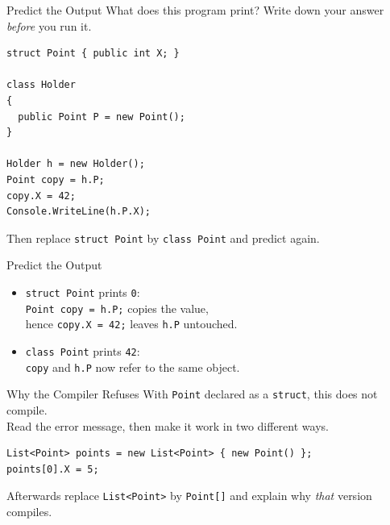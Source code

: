 \begin{exerciseframe}{Predict the Output}
  What does this program print? Write down your answer \emph{before} you run it.
  \vspace{1ex}

  \begin{lstlisting}[basicstyle=\scriptsize\ttfamily]
struct Point { public int X; }

class Holder
{
  public Point P = new Point();
}

Holder h = new Holder();
Point copy = h.P;
copy.X = 42;
Console.WriteLine(h.P.X);
  \end{lstlisting}
  \vspace{1ex}

  Then replace \texttt{struct Point} by \texttt{class Point} and predict again.
\end{exerciseframe}

\begin{solutionframe}{Predict the Output}
  \begin{itemize}
    \item \texttt{struct Point} prints \texttt{0}:\\
       \texttt{Point copy = h.P;} copies the value,\\
       hence \texttt{copy.X = 42;} leaves \texttt{h.P}
       untouched.
    \item \texttt{class Point} prints \texttt{42}:\\
     \texttt{copy} and \texttt{h.P} now refer to the same object.
  \end{itemize}
  \vspace{3ex}

\end{solutionframe}

\begin{exerciseframe}{Why the Compiler Refuses}
  With \texttt{Point} declared as a \texttt{struct}, this does not compile.\\
  Read the error message, then make it work in two different ways.
  \vspace{1ex}

  \begin{lstlisting}[basicstyle=\scriptsize\ttfamily]
List<Point> points = new List<Point> { new Point() };
points[0].X = 5;
  \end{lstlisting}
  \vspace{1ex}

  Afterwards replace \texttt{List<Point>} by \texttt{Point[]} and explain why
  \emph{that} version compiles.
\end{exerciseframe}

